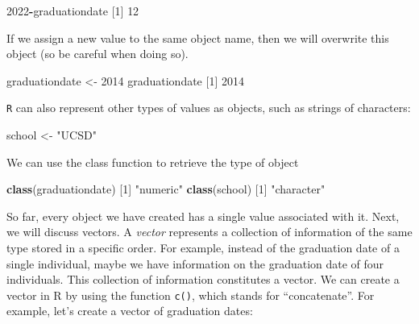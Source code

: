 \documentclass[
]{book}
\newenvironment{Shaded}{\begin{snugshade}}{\end{snugshade}}
\newcommand{\DecValTok}[1]{\textcolor[rgb]{0.00,0.00,0.81}{#1}}
\newcommand{\FunctionTok}[1]{\textcolor[rgb]{0.13,0.29,0.53}{\textbf{#1}}}
\newcommand{\NormalTok}[1]{#1}
\newcommand{\OtherTok}[1]{\textcolor[rgb]{0.56,0.35,0.01}{#1}}
\newcommand{\SpecialCharTok}[1]{\textcolor[rgb]{0.81,0.36,0.00}{\textbf{#1}}}
\newcommand{\StringTok}[1]{\textcolor[rgb]{0.31,0.60,0.02}{#1}}
\begin{document}
\begin{Shaded}
\begin{Highlighting}[]
\DecValTok{2022}\SpecialCharTok{{-}}\NormalTok{graduationdate}
\NormalTok{[}\DecValTok{1}\NormalTok{] }\DecValTok{12}
\end{Highlighting}
\end{Shaded}

If we assign a new value to the same object name, then we will overwrite this object (so be careful when doing so).

\begin{Shaded}
\begin{Highlighting}[]
\NormalTok{graduationdate }\OtherTok{\textless{}{-}} \DecValTok{2014}
\NormalTok{graduationdate}
\NormalTok{[}\DecValTok{1}\NormalTok{] }\DecValTok{2014}
\end{Highlighting}
\end{Shaded}

\texttt{R} can also represent other types of values as objects, such as strings of characters:

\begin{Shaded}
\begin{Highlighting}[]
\NormalTok{school }\OtherTok{\textless{}{-}} \StringTok{"UCSD"}
\end{Highlighting}
\end{Shaded}

We can use the class function to retrieve the type of object

\begin{Shaded}
\begin{Highlighting}[]
\FunctionTok{class}\NormalTok{(graduationdate)}
\NormalTok{[}\DecValTok{1}\NormalTok{] }\StringTok{"numeric"}
\FunctionTok{class}\NormalTok{(school)}
\NormalTok{[}\DecValTok{1}\NormalTok{] }\StringTok{"character"}
\end{Highlighting}
\end{Shaded}

So far, every object we have created has a single value associated with it. Next, we will discuss vectors. A \emph{vector} represents a collection of information of the same type stored in a specific order. For example, instead of the graduation date of a single individual, maybe we have information on the graduation date of four individuals. This collection of information constitutes a vector. We can create a vector in R by using the function \texttt{c()}, which stands for ``concatenate''. For example, let's create a vector of graduation dates:
\end{document}
